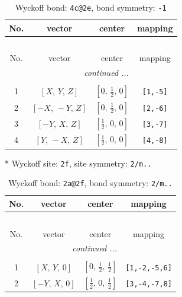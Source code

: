 \documentclass[fleqn,8pt]{jsarticle}
\begin{document}
\begin{longtable}{cccc}
\caption{Wyckoff bond: {\tt 4c@2e}, bond symmetry: {\tt -1}}
 \\
 \hline \hline
No. & vector & center & mapping \\ \hline \endfirsthead

\multicolumn{3}{l}{\tablename\ \thetable{}} \\
 \hline \hline
No. & vector & center & mapping \\ \hline \endhead

 \hline \hline
\multicolumn{3}{r}{\footnotesize\it continued ...} \\ \endfoot

 \hline \hline
\multicolumn{3}{r}{} \\ \endlastfoot

1 & $\left[ X,\, Y,\, Z \right]$ & $\left[ 0,\, \frac{1}{2},\, 0 \right]$ & {\tt [1,-5]} \\ \hline
2 & $\left[ - X,\, - Y,\, Z \right]$ & $\left[ 0,\, \frac{1}{2},\, 0 \right]$ & {\tt [2,-6]} \\ \hline
3 & $\left[ - Y,\, X,\, Z \right]$ & $\left[ \frac{1}{2},\, 0,\, 0 \right]$ & {\tt [3,-7]} \\ \hline
4 & $\left[ Y,\, - X,\, Z \right]$ & $\left[ \frac{1}{2},\, 0,\, 0 \right]$ & {\tt [4,-8]} \\
\end{longtable}
* Wyckoff site: {\tt 2f}, site symmetry: {\tt 2/m..}
\renewcommand{\arraystretch}{1.2}
\begin{longtable}{cccc}
\caption{Wyckoff bond: {\tt 2a@2f}, bond symmetry: {\tt 2/m..}}
 \\
 \hline \hline
No. & vector & center & mapping \\ \hline \endfirsthead

\multicolumn{3}{l}{\tablename\ \thetable{}} \\
 \hline \hline
No. & vector & center & mapping \\ \hline \endhead

 \hline \hline
\multicolumn{3}{r}{\footnotesize\it continued ...} \\ \endfoot

 \hline \hline
\multicolumn{3}{r}{} \\ \endlastfoot

1 & $\left[ X,\, Y,\, 0 \right]$ & $\left[ 0,\, \frac{1}{2},\, \frac{1}{2} \right]$ & {\tt [1,-2,-5,6]} \\ \hline
2 & $\left[ - Y,\, X,\, 0 \right]$ & $\left[ \frac{1}{2},\, 0,\, \frac{1}{2} \right]$ & {\tt [3,-4,-7,8]} \\
\end{longtable}
\end{document}
